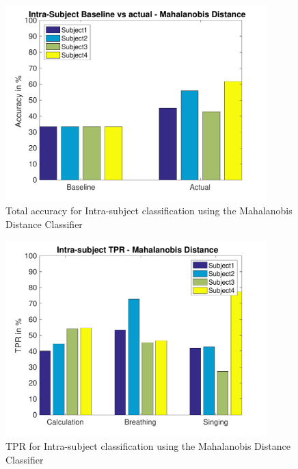         \begin{figure}[hbtp]
	    	\centering
	    	\includegraphics[width=0.90\textwidth]{Chapter-4/base_tm}
	    	\caption{Total accuracy for Intra-subject classification using the Mahalanobis Distance Classifier}
	    	\label{fig:chap4IntraMT}
    	\end{figure}

    	\begin{figure}[hbtp]
	    	\centering
	    	\includegraphics[width=0.90\textwidth]{Chapter-4/base_tprm}
	    	\caption{TPR for Intra-subject classification using the Mahalanobis Distance Classifier}
	    	\label{fig:chap4IntraMTPR}
    	\end{figure}

